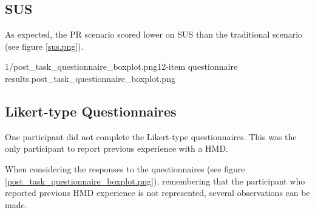 
\subsection{SUS}
As expected, the PR scenario scored lower on SUS than the traditional scenario (see figure \ref{sus.png}).

       {1/post_task_questionnaire_boxplot.png}{12-item questionnaire results.}{post_task_questionnaire_boxplot.png}


\subsection{Likert-type Questionnaires}

One participant did not complete the Likert-type questionnaires. This was the only participant to report previous experience with a HMD.

When considering the responses to the questionnaires (see figure \ref{post_task_questionnaire_boxplot.png}), remembering that the participant who reported previous HMD experience is not represented, several observations can be made.

